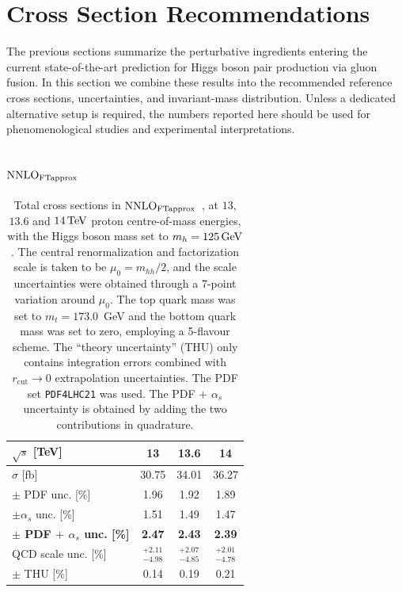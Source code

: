 

\section{Cross Section Recommendations}\label{sec:recs}

The previous sections summarize the perturbative ingredients entering the current state-of-the-art prediction for Higgs boson pair production via gluon fusion. In this section we combine these results into the recommended reference cross sections, uncertainties, and invariant-mass distribution. Unless a dedicated alternative setup is required, the numbers reported here should be used for phenomenological studies and experimental interpretations.

\subsection[\texorpdfstring{NNLO$_{\textup{FTapprox}}$}{NNLO FTapprox}]{\texorpdfstring{\boldmath$\textup{NNLO}_{\textup{FTapprox}}$}{NNLO FTapprox}}

\begin{table}[htbp]
\begin{center}
\begin{tabular}{lccc}
\toprule
$\sqrt{s}$ [TeV] & \textbf{13} & \textbf{13.6} & \textbf{14} \\
\midrule
$\sigma$ [fb] & 30.75 & 34.01 & 36.27 \\\hline
$\pm$ PDF unc. [\%] & 1.96 & 1.92 & 1.89 \\
$\pm \alpha_s$ unc. [\%] & 1.51 & 1.49 & 1.47 \\
{\bfseries\boldmath $\pm$ PDF $+$ $\alpha_s$ unc. [\%]} & \textbf{2.47} & \textbf{2.43} & \textbf{2.39} \\\hline
QCD scale unc. [\%] & $^{+2.11}_{-4.98}$ & $^{+2.07}_{-4.85}$ & $^{+2.01}_{-4.78}$ \\
$\pm$ THU [\%] & 0.14 & 0.19 & 0.21 \\
\bottomrule
\end{tabular}
\caption{Total cross sections in $\textup{NNLO}_{\textup{FTapprox}}$~\cite{Grazzini:2018bsd}, at $13$, $13.6$ and $14\,\textup{TeV}$ proton centre-of-mass energies, with the Higgs boson mass set to $m_h = 125\,\textup{GeV}$. The central renormalization and factorization scale is taken to be $\mu_0  = m_{hh}/2$, and the scale uncertainties were obtained through a 7-point variation around $\mu_0$. The top quark mass was set to $m_t=173.0$~GeV and the bottom quark mass was set to zero, employing a 5-flavour scheme. The ``theory uncertainty'' (THU) only contains integration errors combined with $r_\mathrm{cut}\rightarrow 0$ extrapolation uncertainties. The PDF set \texttt{PDF4LHC21} was used. The PDF $+$ $\alpha_s$ uncertainty is obtained by adding the two contributions in quadrature.}
\label{tab:nnlo_ftapprox_xs_125}
\end{center}
\end{table}

